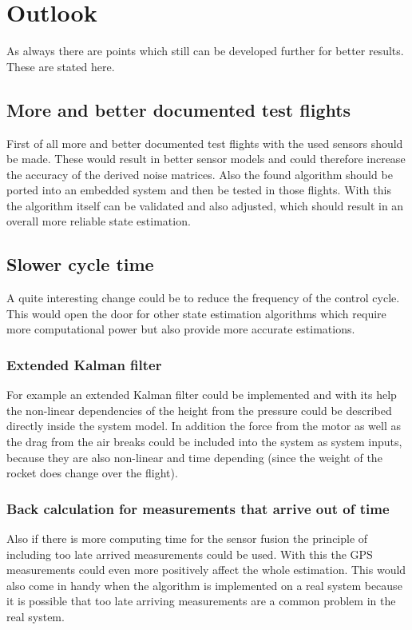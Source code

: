 \section{Outlook}
As always there are points which still can be developed further for better results. These are stated here.

\subsection{More and better documented test flights}
First of all more and better documented test flights with the used sensors should be made.
These would result in better sensor models and could therefore increase the accuracy of the derived noise matrices.
Also the found algorithm should be ported into an embedded system and then be tested in those flights.
With this the algorithm itself can be validated and also adjusted, which should result in an overall more reliable state estimation.

\subsection{Slower cycle time}
A quite interesting change could be to reduce the frequency of the control cycle.
This would open the door for other state estimation algorithms which require more computational power but also provide more accurate estimations.

\subsubsection{Extended Kalman filter}
For example an extended Kalman filter could be implemented and with its help the non-linear dependencies of the height from the pressure
could be described directly inside the system model.
In addition the force from the motor as well as the drag from the air breaks could be included into the system as system inputs, because they are also non-linear and time depending (since the weight of the rocket does change over the flight).

\subsubsection{Back calculation for measurements that arrive out of time}
Also if there is more computing time for the sensor fusion the principle of including too late arrived measurements could be used.
With this the GPS measurements could even more positively affect the whole estimation.
This would also come in handy when the algorithm is implemented on a real system because
it is possible that too late arriving measurements are a common problem in the real system.

